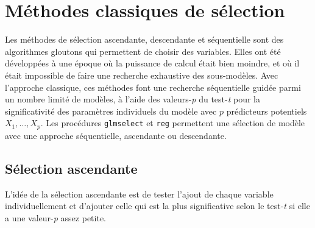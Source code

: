 \documentclass[
  11pt,
  letterpaper,
]{book}
\theoremstyle{definition}
\theoremstyle{definition}
\theoremstyle{definition}
\theoremstyle{definition}
\theoremstyle{remark}
\begin{document}
\hypertarget{muxe9thodes-classiques-de-suxe9lection}{%
\section{Méthodes classiques de sélection}\label{muxe9thodes-classiques-de-suxe9lection}}

Les méthodes de sélection ascendante, descendante et séquentielle sont des algorithmes gloutons qui permettent de choisir des variables. Elles ont été développées à une époque où la puissance de calcul était bien moindre, et où il était impossible de faire une recherche exhaustive des sous-modèles. Avec l'approche classique, ces méthodes font une recherche séquentielle guidée parmi un nombre limité de modèles, à l'aide des valeurs-\emph{p} du test-\emph{t} pour la significativité des paramètres individuels du modèle avec \(p\) prédicteurs potentiels \(X_1,\ldots, X_p\). Les procédures \texttt{glmselect} et \texttt{reg} permettent une sélection de modèle avec une approche séquentielle, ascendante ou descendante.

\hypertarget{suxe9lection-ascendante}{%
\subsection{Sélection ascendante}\label{suxe9lection-ascendante}}

L'idée de la sélection ascendante est de tester l'ajout de chaque variable individuellement et d'ajouter celle qui est la plus significative selon le test-\emph{t} si elle a une valeur-\emph{p} assez petite.
\end{document}
